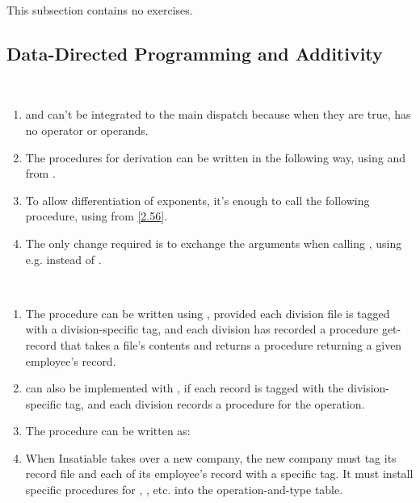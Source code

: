This subsection contains no exercises.

\subsection{Data-Directed Programming and Additivity}

\begin{exe}[2.73]
    \label{2.73}
    \ \vspace{-20pt}
    \begin{enumerate}
        \item {} and  can’t be integrated to 
            the main dispatch because when they are true,  has no 
            operator or operands.

	\item The procedures for derivation can be written in the following way, 
	    using  and  from 
	    .

	\item To allow differentiation of exponents, it’s enough to call the 
	    following procedure, using  from 
	    \autoref{2.56}.

        \item The only change required is to exchange the arguments when calling 
            , using e.g.  instead of 
            .
    \end{enumerate}
\end{exe}

\begin{exe}[2.74]
    \ \vspace{-20pt}
    \begin{enumerate}
        \item The  procedure can be written using 
            , provided each division file is tagged with 
            a division-specific tag, and each division has recorded a procedure 
            get-record that takes a file’s contents and returns a procedure 
            returning a given employee’s record.
        \item {} can also be implemented with 
            , if each record is tagged with the 
            division-specific tag, and each division records a procedure for the 
             operation.
        \item The  procedure can be written as:
        \item When Insatiable takes over a new company, the new company must tag 
            its record file and each of its employee’s record with a specific 
            tag. It must install specific procedures for , 
            , etc. into the operation-and-type table.
    \end{enumerate}
\end{exe}

